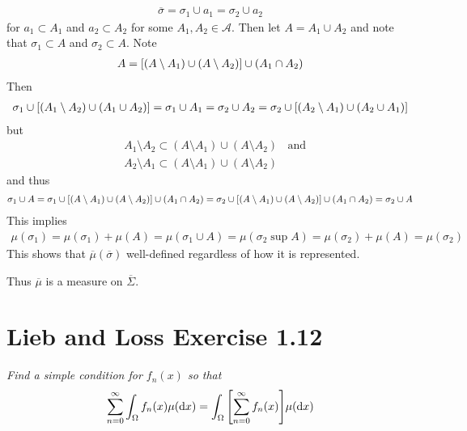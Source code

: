 \documentclass[12pt]{article}
\theoremstyle{plain}
\begin{document}
\begin{enumerate}[(i)]
        \begin{align*}
            \overline{\sigma} = \sigma_1 \cup a_1 = \sigma_2 \cup a_2
        \end{align*}
        for $a_1 \subset A_1$ and $a_2 \subset A_2$ for some $A_1, A_2 \in \mathcal{A}$.  Then let $A = A_1 \cup A_2$ and note that $\sigma_1 \subset A$ and $\sigma_2 \subset A$.  Note
        \begin{align*}
            A = \qty[(A \setminus A_1) \cup (A \setminus A_2)] \cup (A_1 \cap A_2)
        \end{align*}
        Then
        \begin{align*}
            \sigma_1 \cup \qty[(A_1 \setminus A_2) \cup (A_1 \cup A_2)] = \sigma_1 \cup A_1 = \sigma_2 \cup A_2 = \sigma_2 \cup \qty[(A_2 \setminus A_1) \cup (A_2 \cup A_1)]
        \end{align*}
        but
        \begin{align*}
            &A_1 \setminus A_2 \subset (A \setminus A_1) \cup (A \setminus A_2)\ \ \ \ \text{and} \\
            &A_2 \setminus A_1 \subset (A \setminus A_1) \cup (A \setminus A_2)
        \end{align*}
        and thus
        \begin{align*}
            \sigma_1 \cup A = \sigma_1 \cup \qty[(A \setminus A_1) \cup (A \setminus A_2)] \cup (A_1 \cap A_2) = \sigma_2 \cup \qty[(A \setminus A_1) \cup (A \setminus A_2)] \cup (A_1 \cap A_2) = \sigma_2 \cup A
        \end{align*}
        This implies
        \begin{align*}
            \mu(\sigma_1) = \mu(\sigma_1) + \mu(A) = \mu(\sigma_1 \cup A) = \mu(\sigma_2 \sup A) = \mu(\sigma_2) + \mu(A) = \mu(\sigma_2)
        \end{align*}
        This shows that $\overline{\mu}(\overline{\sigma})$ well-defined regardless of how it is represented.
\end{enumerate}
Thus $\overline{\mu}$ is a measure on $\overline{\Sigma}$.

\section*{Lieb and Loss Exercise 1.12}
\emph{Find a simple condition for $f_n(x)$ so that}
\begin{align*}
    \sum_{n=0}^\infty \int_\Omega f_n(x) \mu(\dd x) = \int_\Omega \qty[\sum_{n=0}^\infty f_n(x)]\mu(\dd x)
\end{align*}
\end{document}
